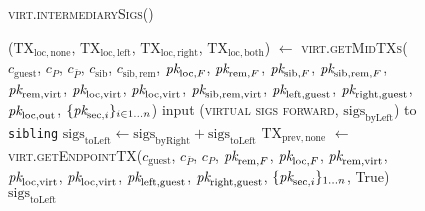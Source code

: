 \begin{figure}[H]
  \begin{processbox}{\textsc{virt.intermediarySigs}()}
    \begin{algorithmic}[1]
      \State ($\mathrm{TX}_{\mathrm{loc}, \mathrm{none}}$,
      $\mathrm{TX}_{\mathrm{loc}, \mathrm{left}}$, $\mathrm{TX}_{\mathrm{loc},
      \mathrm{right}}$, $\mathrm{TX}_{\mathrm{loc}, \mathrm{both}}$) $\gets$
      \textsc{virt.getMidTXs}($c_{\mathrm{guest}}$, $c_P$, $c_{\bar{P}}$,
      $c_{\mathrm{sib}}$, $c_{\mathrm{sib}, \mathrm{rem}}$, $\textit{pk}_{\mathrm{loc},
      F}$, $\textit{pk}_{\mathrm{rem}, F}$, $\textit{pk}_{\mathrm{sib}, F}$, $\textit{pk}_{\mathrm{sib},
      \mathrm{rem}, F}$, $\textit{pk}_{\mathrm{rem}, \mathrm{virt}}$, $\textit{pk}_{\mathrm{loc},
      \mathrm{virt}}$, $\textit{pk}_{\mathrm{loc}, \mathrm{virt}}$, $\textit{pk}_{\mathrm{sib},
      \mathrm{rem}, \mathrm{virt}}$, $\textit{pk}_{\mathrm{left}, \mathrm{guest}}$,
      $\textit{pk}_{\mathrm{right}, \mathrm{guest}}$, $\textit{pk}_{\mathrm{loc}, \mathrm{out}}$,
      $\{\textit{pk}_{\mathrm{sec}, i}\}_{i \in 1 \dots n}$)
      \State {}
      \State input (\textsc{virtual sigs forward},
      $\mathrm{sigs}_{\mathrm{byLeft}}$) to \texttt{sibling}
      \State {}
      \State $\mathrm{sigs}_{\mathrm{toLeft}} \gets
      \mathrm{sigs}_{\mathrm{byRight}} + \mathrm{sigs}_{\mathrm{toLeft}}$
        \State $\mathrm{TX}_{\mathrm{prev}, \mathrm{none}}$ $\gets$
        \textsc{virt.getEndpointTX}($c_{\mathrm{guest}}$, $c_{\bar{P}}$, $c_P$,
        $\textit{pk}_{\mathrm{rem}, F}$, $\textit{pk}_{\mathrm{loc}, F}$, $\textit{pk}_{\mathrm{rem},
        \mathrm{virt}}$, $\textit{pk}_{\mathrm{loc}, \mathrm{virt}}$, $\textit{pk}_{\mathrm{loc},
        \mathrm{virt}}$, $\textit{pk}_{\mathrm{left}, \mathrm{guest}}$,
        $\textit{pk}_{\mathrm{right}, \mathrm{guest}}$, $\{\textit{pk}_{\mathrm{sec}, i}\}_{1
        \dots n}$, True)
      \EndIf
      \State \Return $\mathrm{sigs}_{\mathrm{toLeft}}$
    \end{algorithmic}
  \end{processbox}
  \caption{}
  \label{code:virtual-layer:intermediary-sigs}
\end{figure}

